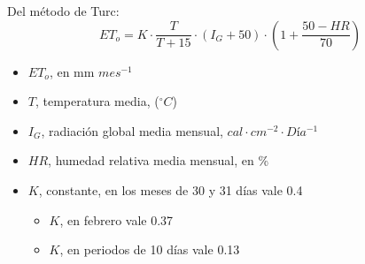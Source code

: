         Del método de Turc:
        \begin{equation}
            ET_o = K \cdot \frac{T}{T +15} \cdot \left(I_G +50\right) \cdot \left(1 + \frac{50 - HR}{70}\right)
        \end{equation}
        \begin{notation}
            \begin{itemize}
                \item $ET_o$, en mm $mes^{-1}$
                \item $T$, temperatura media, ($^{\circ}C$)
                \item $I_G$, radiación global media mensual, $cal\cdot cm^{-2}\cdot Día^{-1}$
                \item $HR$, humedad relativa media mensual, en \%
                \item $K$, constante, en los meses de 30 y 31 días vale 0.4\begin{itemize}
                    \item $K$, en febrero vale 0.37
                    \item $K$, en periodos de 10 días vale 0.13
                \end{itemize}
            \end{itemize}
        \end{notation}
        
